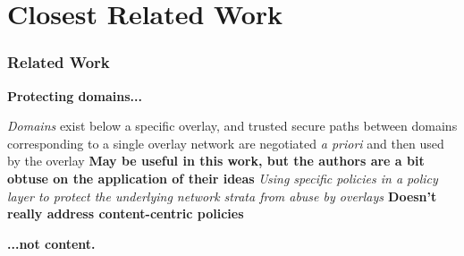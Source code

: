 \section{Closest Related Work}
\begin{frame}
\frametitle{Related Work}
\begin{beamerboxesrounded}[shadow]{}
\textbf{Protecting domains...}
\end{beamerboxesrounded}
\textit{Domains} exist below a specific overlay, and trusted secure paths between domains corresponding to a single overlay network are negotiated \textit{a priori} and then used by the overlay \cite{4457175}
\newline
\newline
\textbf{May be useful in this work, but the authors are a bit obtuse on the application of their ideas}
\newline
\newline
\textit{Using specific policies in a policy layer to protect the underlying network strata from abuse by overlays \cite{4404172}}
\newline
\newline
\textbf{Doesn't really address content-centric policies}
\newline
\newline
\begin{beamerboxesrounded}[shadow]{}
\textbf{...not content.}
\end{beamerboxesrounded}
\end{frame}